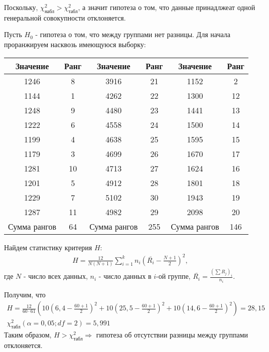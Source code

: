 \documentclass[utf8, a4paper, 14pt, russian, oneside]{book}
\begin{document}
Поскольку, $\chi^2_{\text{набл}} > \chi^2_{\text{табл}}$, а значит гипотеза о том, что данные принадлжеат одной генеральной совокупности отклоняется.

\newpage


Пусть $H_0$ - гипотеза о том, что между группами нет разницы. Для начала проранжируем насквозь имеющуюся выборку:
\begin{table}[h!]
    \centering
    \begin{tabular}{|c|c|c|c|c|c|}
        \hline
        Значение & Ранг & Значение & Ранг & Значение & Ранг \\ \hline
        1246 & 8  & 3916 & 21 & 1152 & 2  \\ \hline 
        1144 & 1  & 4262 & 22 & 1300 & 12 \\ \hline 
        1248 & 9  & 4480 & 23 & 1441 & 13 \\ \hline 
        1222 & 6  & 4558 & 24 & 1500 & 14 \\ \hline 
        1199 & 4  & 4638 & 25 & 1595 & 15 \\ \hline 
        1179 & 3  & 4699 & 26 & 1670 & 17 \\ \hline 
        1281 & 10 & 4713 & 27 & 1624 & 16 \\ \hline 
        1201 & 5  & 4912 & 28 & 1801 & 18 \\ \hline 
        1229 & 7  & 5102 & 30 & 1943 & 19 \\ \hline 
        1287 & 11 & 4982 & 29 & 2098 & 20 \\ \hline 
        Сумма рангов & 64 & Сумма рангов & 255 & Сумма рангов & 146 \\ \hline
    \end{tabular} 
\end{table}

Найдем статистику критерия $H$:
\begin{align*}
    H = \frac{12}{N(N+1)} \sum_{i=1}^k n_i \left(\overline{R_i} - \frac{N+1}{2}\right)^2,
\end{align*}
где $N$ - число всех данных, $n_i$ - число данных в $i$-ой группе, $\overline{R_i} = \tfrac{(\sum R_j)_i}{n_i}$.

Получим, что
\begin{gather*}
    H = \frac{12}{60 \cdot 61} \left(
        10\left(6,4 -  \tfrac{60 + 1}{2}\right)^2 + 
        10\left(25,5 - \tfrac{60 + 1}{2}\right)^2 + 
        10\left(14,6 - \tfrac{60 + 1}{2}\right)^2
    \right) = 28,15\\
    \chi^2_{\text{табл}}(\alpha = 0,05; df=2)=5,991
\end{gather*}
Таким образом, $H > \chi^2_{\text{табл}} \Rightarrow$ гипотеза об отсутствии разницы между группами отклоняется.

\newpage
{}
\end{document}
